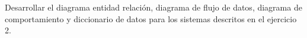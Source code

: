 Desarrollar el diagrama entidad relación, diagrama de flujo de datos, diagrama de comportamiento y diccionario de datos para los sistemas descritos en el ejercicio 2.
